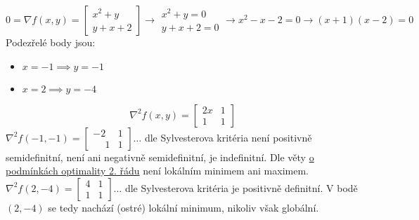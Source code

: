 \[
    0 = \nabla f(x, y) =
    \begin{bmatrix}
        x^2 + y \\
        y + x + 2
    \end{bmatrix} \rightarrow
    \begin{matrix}
        x^2 + y = 0 \\
        y + x + 2 = 0
    \end{matrix} \rightarrow x^2 - x - 2 = 0 \rightarrow (x+1)(x-2) = 0
\]
Podezřelé body jsou:
\begin{itemize}
    \item $x = -1 \implies y = -1$
    \item $x = 2 \implies y = -4$
\end{itemize}
\[
    \nabla^2 f(x, y) =
    \begin{bmatrix}
        2x & 1 \\
        1 & 1
    \end{bmatrix}
\]
$\nabla^2 f(-1, -1) =
\begin{bmatrix}
    -2 & 1 \\
    \phantom{-}1 & 1
\end{bmatrix} \dots$ dle Sylvesterova kritéria není positivně semidefinitní, není ani negativně semidefinitní, je
indefinitní. Dle věty \hyperref[podOpt2]{o podmínkách optimality 2. řádu} není lokálním minimem ani maximem.\\
$\nabla^2 f(2, -4) =
\begin{bmatrix}
    4 & 1 \\
    1 & 1
\end{bmatrix} \dots$ dle Sylvesterova kritéria je positivně definitní. V bodě $(2, -4)$ se tedy nachází (ostré) lokální
minimum, nikoliv však globální.

